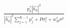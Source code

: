 \documentclass[preview]{standalone}
\begin{document}
\begin{align*}
\frac{p_k^\ast \left|\hat{h_k}\right|^2}{\left|\hat{h_k}\right|^2 \sum_{j=1}^{K-1} {p_j^\ast} + P \sigma_{\epsilon}^2 + w_B^\ast \sigma^2}
\end{align*}
\end{document}
